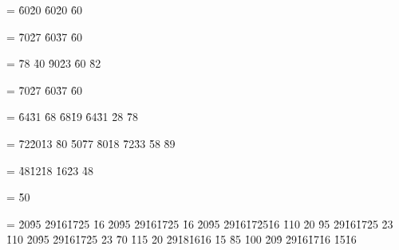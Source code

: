 \def\WW{{\bold{\underline{W}}}}
\setbox\boxV=
\vbox{\ofi
{} {\h{60}\s{\WW[-x|1]}\h{20}\s{\WW[1|x]}}
 {\h{60}\s{\WW[-1|x]}\h{20}\s{\WW[x|1]}}
 {\h{60}}
\vskip 4mm
 }

\setbox\boxW=
\vbox{\ofi
{} {\h{70}\h{27}}
 {\h{60}\s{\WW[1|xy]}\h{37}\s{\WW[-1|x]}}
 {\h{60}}
\vskip 3mm
}

\setbox\boxX=
\vbox{\ofi
{} {\h{78}\s{\WW[-1-x|]}}
 {\h{40}\s{\WW[1-x|]}}
 {\h{90}\h{23}}
 {\h{60}}
 {\h{82}\s{\WW[1x|]}}
\vskip 3mm
}

\setbox\boxY=
\vbox{\ofi
{} {\h{70}\h{27}}
 {\h{60}\s{\WW[1x|y]}\h{37}\s{\WW[xy|]}}
 {\h{60}}
\vskip 3mm
}

\setbox\boxAA=
\vbox{\ofi
{} {\h{64}\h{31}}
 {\h{68}}
 {\h{68}\h{19}}
 {\h{64}\h{31}}
  {\h{28}}
  {\h{78}\s{\gamma}}
\vskip 4mm
}

\setbox\boxBB=
\vbox{\ofi
{} {\h{72}\h{20}\h{13}}
  {\h{80}}
  {\h{50}\h{77}}
  {\h{80}\h{18}}
 {\h{72}\h{33}}
 {\h{58}}
  {\h{89}\s{\gamma}}
\vskip 3mm
 }

\setbox\boxCC=
\vbox{\ofi
{} {\h{48}\h{12}\h{18}
	\h{16}\h{23}}
 {\h{48}}
\vskip 3mm
 }

\setbox\boxDD=
\vbox{\ofi
{} {\h{50}}
\vskip 3mm
 }

\setbox\boxEE=
\vbox{\ofi
{} {\h{20}\h{95}} %
 {\h{29}\s{\t}\h{16}\h{17}\h{25}
       \h{16}}
 {\h{20}\h{95}} %
 {\h{29}\s{\t}\h{16}\h{17}\h{25}
       \h{16}}
 {\h{20}\h{95}}
 {\h{29}\h{16}\h{17}\h{25}\h{16}\s{\t}}
 {\h{110}}
 {\h{20}
       \h{95}}
 {\h{29}\h{16}\h{17}\h{25}
       \h{23}}
 {\h{110}}
 {\h{20}\h{95}}
 {\h{29}\h{16}\h{17}\h{25}
       \h{23}\s{\t}}
 {\h{70}}
 {\h{115}}
 {\h{20}}
 {\h{29}\s{\t}\h{18}\h{16}\h{16}\s{\t}
	\h{15}}
 {\h{85}\s{\t}}
 {\h{100}}
 {\h{20}\h{9}}
 {\h{29}\s{\t}\h{16}\h{17}\s{\t}\h{16}
       \h{15}\h{16}}
\vskip 3mm
}


